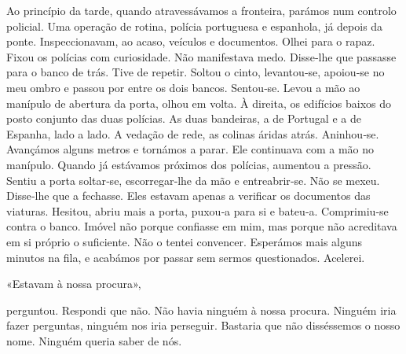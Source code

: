 Ao princípio da tarde, quando atravessávamos a fronteira, parámos num
controlo policial. Uma operação de rotina, polícia portuguesa e
espanhola, já depois da ponte. Inspeccionavam, ao acaso, veículos e
documentos. Olhei para o rapaz. Fixou os polícias com curiosidade. Não
manifestava medo. Disse­‑lhe que passasse para o banco de trás. Tive de
repetir. Soltou o cinto, levantou­‑se, apoiou­‑se no meu ombro e passou
por entre os dois bancos. Sentou­‑se. Levou a mão ao manípulo de
abertura da porta, olhou em volta. À direita, os edifícios baixos do
posto conjunto das duas polícias. As duas bandeiras, a de Portugal e a
de Espanha, lado a lado. A vedação de rede, as colinas áridas atrás.
Aninhou­‑se. Avançámos alguns metros e tornámos a parar. Ele continuava
com a mão no manípulo. Quando já estávamos próximos dos polícias,
aumentou a pressão. Sentiu a porta soltar­‑se, escorregar­‑lhe da mão e
entreabrir­‑se. Não se mexeu. Disse­‑lhe que a fechasse. Eles estavam
apenas a verificar os documentos das viaturas. Hesitou, abriu mais a
porta, puxou­‑a para si e bateu­‑a. Comprimiu­‑se contra o banco. Imóvel
não porque confiasse em mim, mas porque não acreditava em si próprio o
suficiente. Não o tentei convencer. Esperámos mais alguns minutos na
fila, e acabámos por passar sem sermos questionados. Acelerei.

«Estavam à nossa procura»,

perguntou. Respondi que não. Não havia ninguém à nossa procura. Ninguém
iria fazer perguntas, ninguém nos iria perseguir. Bastaria que não
disséssemos o nosso nome. Ninguém queria saber de nós.


